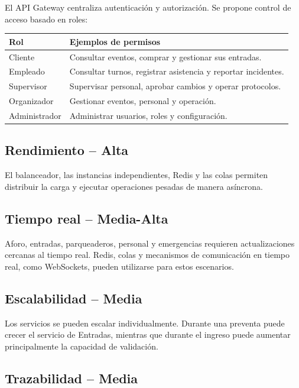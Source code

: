 \documentclass[12pt,a4paper]{article}
\begin{document}
El API Gateway centraliza autenticación y autorización. Se propone control de acceso basado en roles:

\begin{center}
\begin{tabular}{p{3cm}p{8cm}}
\toprule
\textbf{Rol} & \textbf{Ejemplos de permisos}\\
\midrule
Cliente & Consultar eventos, comprar y gestionar sus entradas.\\
Empleado & Consultar turnos, registrar asistencia y reportar incidentes.\\
Supervisor & Supervisar personal, aprobar cambios y operar protocolos.\\
Organizador & Gestionar eventos, personal y operación.\\
Administrador & Administrar usuarios, roles y configuración.\\
\bottomrule
\end{tabular}
\end{center}

\subsection{Rendimiento -- Alta}

El balanceador, las instancias independientes, Redis y las colas permiten distribuir la carga y ejecutar operaciones pesadas de manera asíncrona.

\subsection{Tiempo real -- Media-Alta}

Aforo, entradas, parqueaderos, personal y emergencias requieren actualizaciones cercanas al tiempo real. Redis, colas y mecanismos de comunicación en tiempo real, como WebSockets, pueden utilizarse para estos escenarios.

\subsection{Escalabilidad -- Media}

Los servicios se pueden escalar individualmente. Durante una preventa puede crecer el servicio de Entradas, mientras que durante el ingreso puede aumentar principalmente la capacidad de validación.

\subsection{Trazabilidad -- Media}
\end{document}
